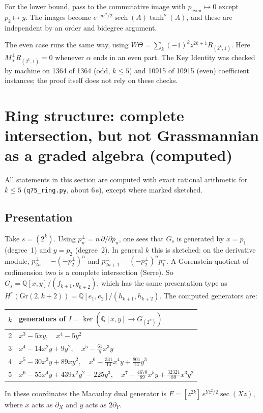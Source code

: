 \documentclass[11pt]{amsart}
\newcommand{\gr}[1]{\textsf{#1}}
\newcommand{\Gr}{\mathrm{Gr}}
\newcommand{\QQ}{\mathbb{Q}}
\theoremstyle{plain}
\theoremstyle{definition}
\begin{document}
For the lower bound, pass to the commutative image with $p_{\mathrm{even}}\mapsto0$ except $p_2\mapsto y$. The images become $e^{-yz^2/2}\operatorname{sech}(A)\tanh^{o}(A)$, and these are independent by an order and bidegree argument.

The even case runs the same way, using $W\Theta=\sum_k(-1)^kz^{2k+1}R_{(2^k,1)}$. Here $M_\alpha^\perp R_{(2^k,1)}=0$ whenever $\alpha$ ends in an even part. The Key Identity was checked by machine on 1364 of 1364 (odd, $k\le5$) and 10915 of 10915 (even) coefficient instances; the proof itself does not rely on these checks.

\section{Ring structure: complete intersection, but not Grassmannian as a graded algebra (computed)}\label{sec:ring}
All statements in this section are \gr{computed} with exact rational arithmetic for $k\le5$ (\texttt{q75\_ring.py}, about 6\,s), except where marked \gr{sketched}.

\subsection*{Presentation}
Take $s=(2^k)$. Using $p_n^\perp=n\,\partial/\partial p_n$, one sees that $G_s$ is generated by $x=p_1$ (degree~1) and $y=p_2$ (degree~2). In general $k$ this is \gr{sketched}: on the derivative module, $p_{2n}^\perp=-(-p_2^\perp)^n$ and $p_{2n+1}^\perp=(-p_2^\perp)^np_1^\perp$. A Gorenstein quotient of codimension two is a complete intersection (Serre). So $G_s=\QQ[x,y]/(f_{k+1},g_{k+2})$, which has the same presentation type as $H^*(\Gr(2,k+2))=\QQ[e_1,e_2]/(h_{k+1},h_{k+2})$. The computed generators are:
\begin{center}\small
\begin{tabular}{@{}cl@{}}
\toprule
$k$ & generators of $I=\ker(\QQ[x,y]\to G_{(2^k)})$\\
\midrule
2 & $x^3-5xy,\quad x^4-5y^2$\\
3 & $x^4-14x^2y+9y^2,\quad x^5-\tfrac{61}{5}x^3y$\\
4 & $x^5-30x^3y+89xy^2,\quad x^6-\tfrac{331}{14}x^4y+\tfrac{801}{14}y^3$\\
5 & $x^6-55x^4y+439x^2y^2-225y^3,\quad x^7-\tfrac{4670}{89}x^5y+\tfrac{32321}{89}x^3y^2$\\
\bottomrule
\end{tabular}
\end{center}
In these coordinates the Macaulay dual generator is $F=[z^{2k}]\,e^{Yz^2/2}\sec(Xz)$, where $x$ acts as $\partial_X$ and $y$ acts as $2\partial_Y$.
\end{document}
